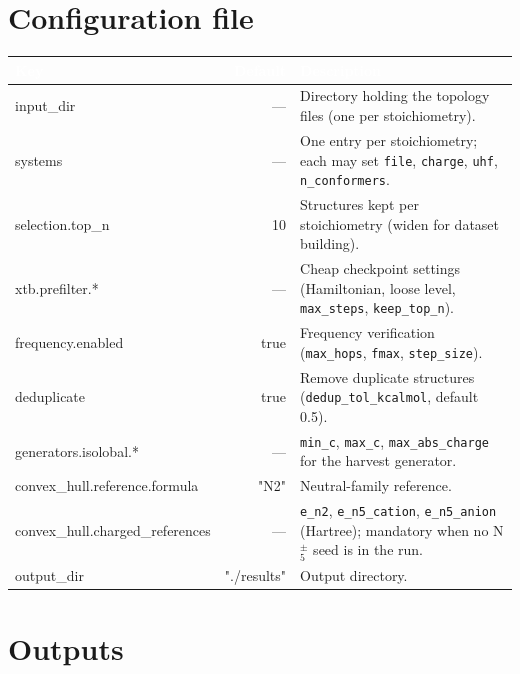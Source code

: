 \documentclass[11pt,a4paper]{article}
\begin{document}
\section{Configuration file}

\begin{longtable}{K D T}
\toprule
{}\textcolor{white}{\bfseries Key} & \textcolor{white}{\bfseries Default} & \textcolor{white}{\bfseries Description} \\
\midrule\endhead
input\_dir & --- & Directory holding the topology files (one per stoichiometry). \\
systems & --- & One entry per stoichiometry; each may set \texttt{file}, \texttt{charge}, \texttt{uhf}, \texttt{n\_conformers}. \\
selection.top\_n & 10 & Structures kept per stoichiometry (widen for dataset building). \\
xtb.prefilter.* & --- & Cheap checkpoint settings (Hamiltonian, loose level, \texttt{max\_steps}, \texttt{keep\_top\_n}). \\
frequency.enabled & true & Frequency verification (\texttt{max\_hops}, \texttt{fmax}, \texttt{step\_size}). \\
deduplicate & true & Remove duplicate structures (\texttt{dedup\_tol\_kcalmol}, default 0.5). \\
generators.isolobal.* & --- & \texttt{min\_c}, \texttt{max\_c}, \texttt{max\_abs\_charge} for the harvest generator. \\
convex\_hull.reference.formula & "N2" & Neutral-family reference. \\
convex\_hull.charged\_references & --- & \texttt{e\_n2}, \texttt{e\_n5\_cation}, \texttt{e\_n5\_anion} (Hartree); mandatory when no N$_5^{\pm}$ seed is in the run. \\
output\_dir & "./results" & Output directory. \\
\bottomrule
\end{longtable}

\section{Outputs}
\end{document}

